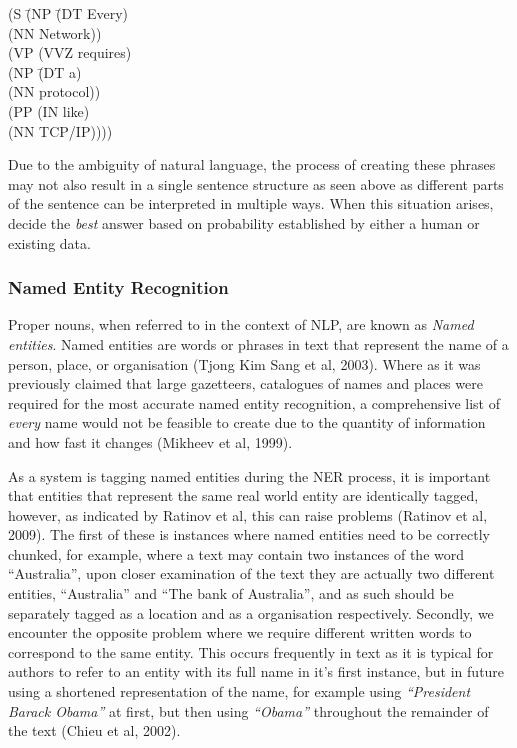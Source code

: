 \documentclass[12pt,a4paper]{article}
\begin{document}
\begin{center}
\parbox{0cm}{\begin{tabbing}
(S \= (NP \= (DT Every)\\
\> \> (NN Network))\\
\> (VP (VVZ requires)\\
\> \> (NP \= (DT a)\\
\> \> \> (NN protocol))\\
\> \> (PP (IN like)\\
\> \> \> (NN TCP/IP))))\\
\end{tabbing}}
\end{center}

Due to the ambiguity of natural language, the process of creating these phrases may not also result in a single sentence structure as seen above as different parts of the sentence can be interpreted in multiple ways. When this situation arises, decide the \emph{best} answer based on probability established by either a human or existing data. \newline

\subsubsection{Named Entity Recognition}
Proper nouns, when referred to in the context of NLP, are known as \emph{Named entities}. Named entities are words or phrases in text that represent the name of a person, place, or organisation (Tjong Kim Sang et al, 2003). Where as it was previously claimed that large gazetteers, catalogues of names and places were required for the most accurate named entity recognition, a comprehensive list of \emph{every} name would not be feasible to create due to the quantity of information and how fast it changes (Mikheev et al, 1999). \newline

As a system is tagging named entities during the NER process, it is important that entities that represent the same real world entity are identically tagged, however, as indicated by Ratinov et al, this can raise problems (Ratinov et al, 2009). The first of these is instances where named entities need to be correctly chunked, for example, where a text may contain two instances of the word ``Australia'', upon closer examination of the text they are actually two different entities, ``Australia'' and ``The bank of Australia'', and as such should be separately tagged as a location and as a organisation respectively. Secondly, we encounter the opposite problem where we require different written words to correspond to the same entity. This occurs frequently in text as it is typical for authors to refer to an entity with its full name in it's first instance, but in future using a shortened representation of the name, for example using \emph{``President Barack Obama''} at first, but then using \emph{``Obama''} throughout the remainder of the text (Chieu et al, 2002). \newline
\end{document}
